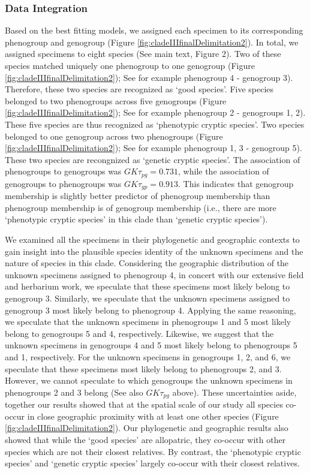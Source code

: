 \documentclass[
  11pt,
]{article}
\begin{document}
\hypertarget{data-integration-3}{%
\subsubsection{Data Integration}\label{data-integration-3}}

Based on the best fitting models, we assigned each specimen to its corresponding phenogroup and genogroup (Figure \ref{fig:cladeIIIfinalDelimitation2}). In total, we assigned specimens to eight species (See main text, Figure 2). Two of these species matched uniquely one phenogroup to one genogroup (Figure \ref{fig:cladeIIIfinalDelimitation2}); See for example phenogroup 4 - genogroup 3). Therefore, these two species are recognized as `good species'. Five species belonged to two phenogroups across five genogroups (Figure \ref{fig:cladeIIIfinalDelimitation2}); See for example phenogroup 2 - genogroups 1, 2). These five species are thus recognized as `phenotypic cryptic species'. Two species belonged to one genogroup across two phenogroups (Figure \ref{fig:cladeIIIfinalDelimitation2}); See for example phenogroup 1, 3 - genogroup 5). These two species are recongnized as `genetic cryptic species'. The association of phenogroups to genogroups was \(GK\tau_{pg}=0.731\), while the association of genogroups to phenogroups was \(GK\tau_{gp}=0.913\). This indicates that genogroup membership is slightly better predictor of phenogroup membership than phenogroup membership is of genogroup membership (i.e., there are more `phenotypic cryptic species' in this clade than `genetic cryptic species').

We examined all the specimens in their phylogenetic and geographic contexts to gain insight into the plausible species identity of the unknown specimens and the nature of species in this clade. Considering the geographic distribution of the unknown specimens assigned to phenogroup 4, in concert with our extensive field and herbarium work, we speculate that these specimens most likely belong to genogroup 3. Similarly, we speculate that the unknown specimens assigned to genogroup 3 most likely belong to phenogroup 4. Applying the same reasoning, we speculate that the unknown specimens in phenogroups 1 and 5 most likely belong to genogroups 5 and 4, respectively. Likewise, we suggest that the unknown specimens in genogroups 4 and 5 most likely belong to phenogroups 5 and 1, respectively. For the unknown specimens in genogroups 1, 2, and 6, we speculate that these specimens most likely belong to phenogroups 2, and 3. However, we cannot speculate to which genogroups the unknown specimens in phenogroups 2 and 3 belong (See also \(GK\tau_{pg}\) above). These uncertainties aside, together our results showed that at the spatial scale of our study all species co-occur in close geographic proximity with at least one other species (Figure \ref{fig:cladeIIIfinalDelimitation2}). Our phylogenetic and geographic results also showed that while the `good species' are allopatric, they co-occur with other species which are not their closest relatives. By contrast, the `phenotypic cryptic species' and `genetic cryptic species' largely co-occur with their closest relatives.
\end{document}

